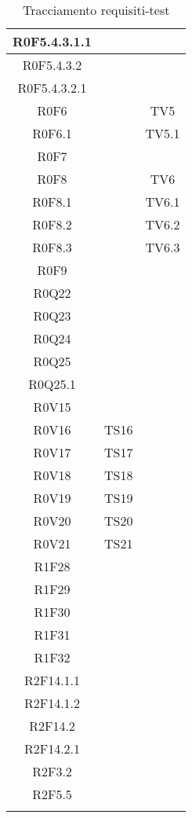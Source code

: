 \begin{center}
\begin{longtable}{|c|c|c|}
\hline
R0F5.4.3.1.1 &  &  \\
\hline
R0F5.4.3.2 &  &  \\
\hline
R0F5.4.3.2.1 &  &  \\
\hline
R0F6 &  & TV5 \\
\hline
R0F6.1 &  & TV5.1 \\
\hline
R0F7 &  &  \\
\hline
R0F8 &  & TV6 \\
\hline
R0F8.1 &  & TV6.1 \\
\hline
R0F8.2 &  & TV6.2 \\
\hline
R0F8.3 &  & TV6.3 \\
\hline
R0F9 &  &  \\
\hline
R0Q22 &  &  \\
\hline
R0Q23 &  &  \\
\hline
R0Q24 &  &  \\
\hline
R0Q25 &  &  \\
\hline
R0Q25.1 &  &  \\
\hline
R0V15 &  &  \\
\hline
R0V16 & TS16  &  \\
\hline
R0V17 & TS17  &  \\
\hline
R0V18 & TS18  &  \\
\hline
R0V19 & TS19  &  \\
\hline
R0V20 & TS20  &  \\
\hline
R0V21 & TS21  &  \\
\hline
R1F28 &  &  \\
\hline
R1F29 &  &  \\
\hline
R1F30 &  &  \\
\hline
R1F31 &  &  \\
\hline
R1F32 &  &  \\
\hline
R2F14.1.1 &  &  \\
\hline
R2F14.1.2 &  &  \\
\hline
R2F14.2 &  &  \\
\hline
R2F14.2.1 &  &  \\
\hline
R2F3.2 &  &  \\
\hline
R2F5.5 &  &  \\
\hline
\caption{Tracciamento requisiti-test}
    \end{longtable}
\end{center}
